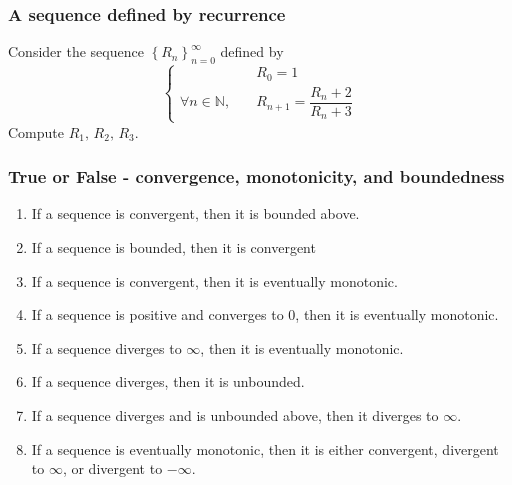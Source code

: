 \documentclass[14pt]{beamer}
\newcommand{\N}{\mathbb{N}}
\newcommand{\setsize}[1]{\fontsize{#1}{#1}\selectfont} %
\newcommand{\smallerfont}{\setsize{13}} %
\newcommand{\Rn}{\left\{ R_n \right\}_{n=0}^{\infty}}
\begin{document}
	\begin{frame}[t]
		\frametitle{A sequence defined by recurrence}

		Consider the sequence ${\displaystyle \Rn}$ defined by
		\begin{equation*}
			\begin{cases}
				                        & R_{0} = 1                          \\
				\forall n \in \N, \quad & R_{n+1}= \dfrac{ R_n + 2}{R_n + 3}
			\end{cases}
		\end{equation*}
		Compute ${\displaystyle R_1, \, R_2, \, R_3}$.
	\end{frame}
	\begin{frame}[t]
		\smallerfont
		\frametitle{\smallerfont True or False - convergence, monotonicity, and
		boundedness}

		\begin{enumerate}
			\item If a sequence is convergent, then it is bounded above.

			\item If a sequence is bounded, then it is convergent

			\item If a sequence is convergent, then it is eventually monotonic.

			\item If a sequence is positive and converges to 0, then it is eventually
				monotonic.

			\item If a sequence diverges to $\infty$, then it is eventually monotonic.

			\item If a sequence diverges, then it is unbounded.

			\item If a sequence diverges and is unbounded above, then it diverges to
				$\infty$.

			\item If a sequence is eventually monotonic, then it is either convergent,
				divergent to $\infty$, or divergent to $-\infty$.
		\end{enumerate}
	\end{frame}
\end{document}
